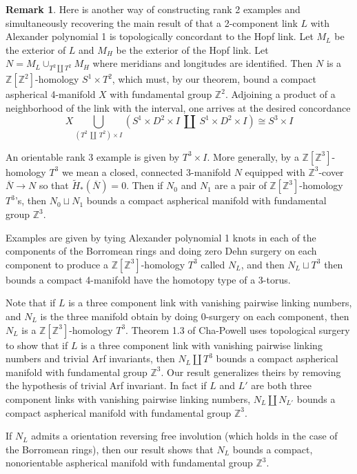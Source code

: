 \documentclass[12pt]{amsart}
\theoremstyle{definition}
\newtheorem{remark}[theorem]{Remark}
\newcommand{\Z}{\mathbb Z}
\newcommand{\ol}[1]{{\overline{#1}}}
\newcommand{\wt}[1]{{\widetilde{#1}}}
\begin{document}
\begin{remark}
Here is another way of constructing rank 2 examples and simultaneously recovering the main result of \cite{D} that a 2-component link $L$ with Alexander polynomial 1 is topologically concordant to the Hopf link.  Let $M_L$ be the exterior of $L$ and $M_H$ be the exterior of the Hopf link.   Let $N = M_L \cup_{T^2 \amalg T^2} M_H$ where meridians and longitudes are identified.  Then $N$ is a $\Z[\Z^2]$-homology $S^1\times{T^2}$, which must, by our theorem, bound a compact aspherical 4-manifold $X$ with fundamental group $\Z^2$.   Adjoining a product of a neighborhood of the link with the interval, one arrives at the desired concordance
$$
X \bigcup_{(T^2~ \amalg ~ T^2) \times I} (S^1 \times D^2 \times I ~ \amalg ~ S^1 \times D^2 \times I)
\cong S^3 \times I$$

An orientable rank 3 example is given by $T^3 \times I$.   More generally, by a $\Z[\Z^3]$-homology $T^3$ we mean a closed, connected  3-manifold $N$ equipped with $\Z^3$-cover $\ol N \to N$ so that $\wt H_*(\ol N) =0$.   Then if $N_0$ and $N_1$ are a pair of $\Z[\Z^3]$-homology $T^3$'s, then $N_0 \sqcup N_1$ bounds a compact aspherical manifold with fundamental group $\Z^3$.


Examples are given by tying Alexander polynomial 1 knots in each of the components of the Borromean rings and doing zero Dehn surgery on each component to produce a $\Z[\Z^3]$-homology $T^3$ called $N_L$, and then $N_L \sqcup T^3$ then bounds a compact 4-manifold have the homotopy type of a 3-torus.

Note that if $L$ is a three component link with vanishing pairwise linking numbers, and $N_L$ is the three manifold obtain by doing 0-surgery on each component, then $N_L$ is a $\Z[\Z^3]$-homology $T^3$.
 Theorem 1.3 of Cha-Powell \cite{CP}  uses topological surgery to show that if $L$ is a three component link with vanishing pairwise linking numbers and trivial Arf invariants, then $N_L \coprod T^3$ bounds a compact aspherical manifold with fundamental group $\Z^3$.   Our result generalizes theirs by removing the hypothesis of trivial Arf invariant.    In fact if $L$ and $L'$ are both three component links with vanishing pairwise linking numbers, $N_L \coprod N_{L'}$ bounds a compact aspherical manifold with fundamental group $\Z^3$.    

If $N_L$ admits a orientation reversing free involution (which holds in the case of the Borromean rings), then our result shows that $N_L$ bounds a compact, nonorientable aspherical manifold with fundamental group $\Z^3$.   
\end{remark} 
\end{document}
